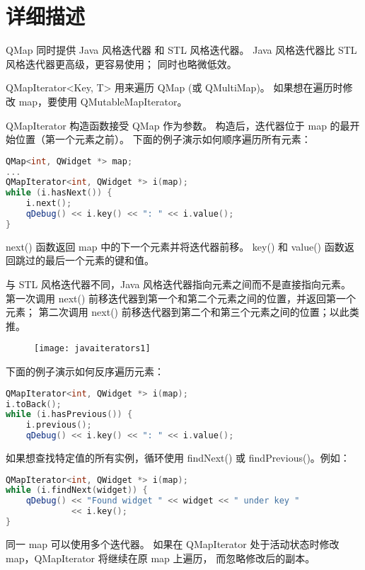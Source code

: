 \section{详细描述}

QMap 同时提供 Java 风格迭代器 和 STL 风格迭代器。
Java 风格迭代器比 STL 风格迭代器更高级，更容易使用；
同时也略微低效。

QMapIterator<Key, T> 用来遍历 QMap (或 QMultiMap)。
如果想在遍历时修改 map，要使用 QMutableMapIterator。

QMapIterator 构造函数接受 QMap 作为参数。
构造后，迭代器位于 map 的最开始位置（第一个元素之前）。
下面的例子演示如何顺序遍历所有元素：

\begin{lstlisting}[language=C++]
QMap<int, QWidget *> map;
...
QMapIterator<int, QWidget *> i(map);
while (i.hasNext()) {
    i.next();
    qDebug() << i.key() << ": " << i.value();
}
\end{lstlisting}

next() 函数返回 map 中的下一个元素并将迭代器前移。
key() 和 value() 函数返回跳过的最后一个元素的键和值。

与 STL 风格迭代器不同，Java 风格迭代器指向元素之间而不是直接指向元素。
第一次调用 next() 前移迭代器到第一个和第二个元素之间的位置，并返回第一个元素；
第二次调用 next() 前移迭代器到第二个和第三个元素之间的位置；以此类推。


\begin{figure}[hpt!]  
	\centering
    \texttt{[image: javaiterators1]}
\end{figure}


下面的例子演示如何反序遍历元素：

\begin{lstlisting}[language=C++]
QMapIterator<int, QWidget *> i(map);
i.toBack();
while (i.hasPrevious()) {
    i.previous();
    qDebug() << i.key() << ": " << i.value();
\end{lstlisting}

如果想查找特定值的所有实例，循环使用 findNext() 或 findPrevious()。例如：

\begin{lstlisting}[language=C++]
QMapIterator<int, QWidget *> i(map);
while (i.findNext(widget)) {
    qDebug() << "Found widget " << widget << " under key "
             << i.key();
}
\end{lstlisting}

同一 map 可以使用多个迭代器。
如果在 QMapIterator 处于活动状态时修改 map，QMapIterator 将继续在原 map 上遍历，
而忽略修改后的副本。

